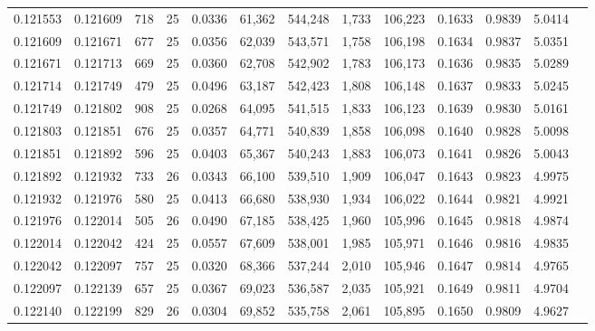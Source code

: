 \begin{tabular}{rrrrrrrrrrrrr}
0.121553 & 0.121609 &   718 &  25 &                                     0.0336 &  61,362 & 544,248 &   1,733 & 106,223 & 0.1633 & 0.9839 & 5.0414 \\
0.121609 & 0.121671 &   677 &  25 &                                     0.0356 &  62,039 & 543,571 &   1,758 & 106,198 & 0.1634 & 0.9837 & 5.0351 \\
0.121671 & 0.121713 &   669 &  25 &                                     0.0360 &  62,708 & 542,902 &   1,783 & 106,173 & 0.1636 & 0.9835 & 5.0289 \\
0.121714 & 0.121749 &   479 &  25 &                                     0.0496 &  63,187 & 542,423 &   1,808 & 106,148 & 0.1637 & 0.9833 & 5.0245 \\
0.121749 & 0.121802 &   908 &  25 &                                     0.0268 &  64,095 & 541,515 &   1,833 & 106,123 & 0.1639 & 0.9830 & 5.0161 \\
0.121803 & 0.121851 &   676 &  25 &                                     0.0357 &  64,771 & 540,839 &   1,858 & 106,098 & 0.1640 & 0.9828 & 5.0098 \\
0.121851 & 0.121892 &   596 &  25 &                                     0.0403 &  65,367 & 540,243 &   1,883 & 106,073 & 0.1641 & 0.9826 & 5.0043 \\
0.121892 & 0.121932 &   733 &  26 &                                     0.0343 &  66,100 & 539,510 &   1,909 & 106,047 & 0.1643 & 0.9823 & 4.9975 \\
0.121932 & 0.121976 &   580 &  25 &                                     0.0413 &  66,680 & 538,930 &   1,934 & 106,022 & 0.1644 & 0.9821 & 4.9921 \\
0.121976 & 0.122014 &   505 &  26 &                                     0.0490 &  67,185 & 538,425 &   1,960 & 105,996 & 0.1645 & 0.9818 & 4.9874 \\
0.122014 & 0.122042 &   424 &  25 &                                     0.0557 &  67,609 & 538,001 &   1,985 & 105,971 & 0.1646 & 0.9816 & 4.9835 \\
0.122042 & 0.122097 &   757 &  25 &                                     0.0320 &  68,366 & 537,244 &   2,010 & 105,946 & 0.1647 & 0.9814 & 4.9765 \\
0.122097 & 0.122139 &   657 &  25 &                                     0.0367 &  69,023 & 536,587 &   2,035 & 105,921 & 0.1649 & 0.9811 & 4.9704 \\
0.122140 & 0.122199 &   829 &  26 &                                     0.0304 &  69,852 & 535,758 &   2,061 & 105,895 & 0.1650 & 0.9809 & 4.9627 \\

\end{tabular}
